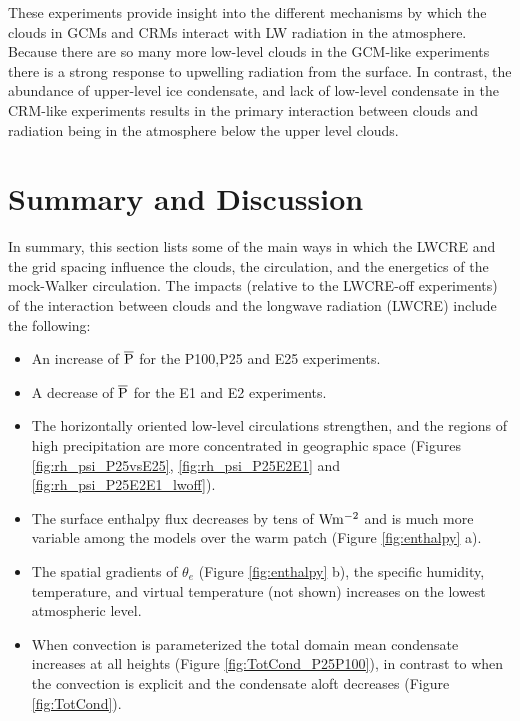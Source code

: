 \documentclass[draft]{agujournal2019}
\begin{document}
{These experiments provide insight into the different mechanisms by which the clouds in GCMs and CRMs
interact with LW radiation in the atmosphere.  Because there are so many more low-level clouds in 
the GCM-like experiments there is a strong response to upwelling radiation from the surface.  In contrast, 
the abundance of upper-level ice condensate, and lack of low-level condensate in the CRM-like experiments 
results in the primary interaction between clouds and radiation being in the atmosphere below the upper level clouds.       

 

\section{Summary and Discussion} 

In summary, this section lists some of the main ways in which the LWCRE and the grid spacing influence
the clouds, the circulation, and the energetics of the mock-Walker circulation.   
The impacts (relative to the LWCRE-off experiments) of the interaction between clouds and the longwave radiation 
(LWCRE) include the following: 

\begin{itemize}
  \item An increase of $\overline{\rm{P}}$  for the P100,P25 and E25 experiments.
  \item A decrease of $\overline{\rm{P}}$  for the E1 and E2 experiments.
  \item The horizontally oriented low-level circulations strengthen, and the regions of high precipitation are more concentrated  
  in geographic space (Figures \ref{fig:rh_psi_P25vsE25}, \ref{fig:rh_psi_P25E2E1} and \ref{fig:rh_psi_P25E2E1_lwoff}).  
  \item The surface enthalpy flux decreases by tens of $\rm{W m^{-2}}$ and is much more variable among the models over the warm patch (Figure \ref{fig:enthalpy} a).
  \item The spatial gradients of $\theta_e$ (Figure \ref{fig:enthalpy} b), the specific humidity, temperature, and virtual temperature 
  (not shown) increases on the lowest atmospheric level.  
  \item When convection is parameterized the total domain mean condensate increases at all heights 
  (Figure \ref{fig:TotCond_P25P100}), in contrast to when the convection is explicit and 
  the condensate aloft decreases (Figure \ref{fig:TotCond}).    
\end{itemize}

}
\end{document}
